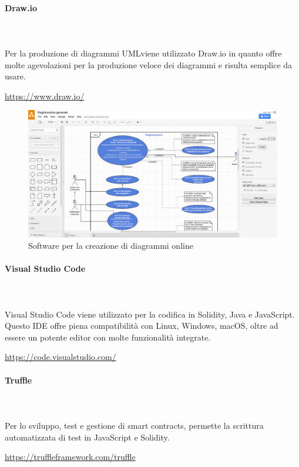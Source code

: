 \begin{itemize}
		\paragraph{Draw.io} \mbox{}\\ \mbox{}\\
		Per la produzione di diagrammi UML\glosp viene utilizzato Draw.io in quanto 
		offre molte agevolazioni per la produzione veloce dei diagrammi e risulta 
		semplice da usare. \newline
		\centerline{\url{https://www.draw.io/}}
			\begin{figure}[H]
				\includegraphics[width=0.99\linewidth]{res/images/drawio.jpg}
				\caption{Software per la creazione di diagrammi online}
			\end{figure} 
				
		\paragraph{Visual Studio Code} \mbox{}\\ \mbox{}\\
		Visual Studio Code viene utilizzato per la codifica in Solidity, Java e JavaScript. Questo 
		IDE offre piena compatibilità con Linux, Windows, macOS, oltre ad essere un 
		potente editor con molte funzionalità integrate. \newline
		\centerline{\url{https://code.visualstudio.com/}}

			
		\paragraph{Truffle} \mbox{}\\ \mbox{}\\
		Per lo sviluppo, test e gestione di smart contracts\glo, permette la scrittura automatizzata di test in JavaScript e Solidity\glo.\newline
		\centerline{\url{https://truffleframework.com/truffle}}
		

\end{itemize}

